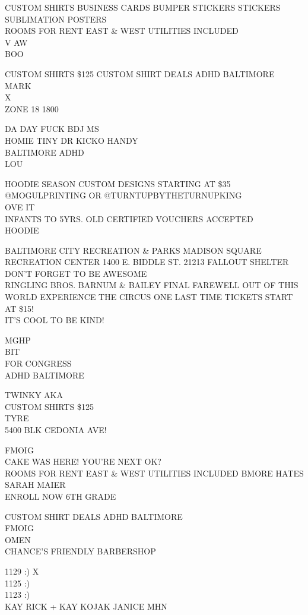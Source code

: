 \documentclass[10pt,letterpaper]{article}
\begin{document}
CUSTOM SHIRTS BUSINESS CARDS BUMPER STICKERS STICKERS SUBLIMATION POSTERS\\
ROOMS FOR RENT EAST \& WEST UTILITIES INCLUDED\\
V AW\\
BOO

CUSTOM SHIRTS \$125 CUSTOM SHIRT DEALS ADHD BALTIMORE\\
MARK\\
X\\
ZONE 18 1800

DA DAY FUCK BDJ MS\\
HOMIE TINY DR  KICKO HANDY\\
BALTIMORE ADHD\\
LOU

HOODIE SEASON CUSTOM DESIGNS STARTING AT \$35 @MOGULPRINTING OR @TURNTUPBYTHETURNUPKING\\
OVE IT\\
INFANTS TO 5YRS. OLD CERTIFIED VOUCHERS ACCEPTED\\
HOODIE

BALTIMORE CITY RECREATION \& PARKS MADISON SQUARE RECREATION CENTER 1400 E. BIDDLE ST. 21213 FALLOUT SHELTER\\
DON'T FORGET TO BE AWESOME\\
RINGLING BROS. BARNUM \& BAILEY FINAL FAREWELL OUT OF THIS WORLD EXPERIENCE THE CIRCUS ONE LAST TIME TICKETS START AT \$15!\\
IT'S COOL TO BE KIND!

MGHP\\
BIT\\
FOR CONGRESS\\
ADHD BALTIMORE

TWINKY AKA\\
CUSTOM SHIRTS \$125\\
TYRE\\
5400 BLK CEDONIA AVE!

FMOIG\\
CAKE WAS HERE!  YOU'RE NEXT OK?\\
ROOMS FOR RENT EAST \& WEST UTILITIES INCLUDED BMORE HATES SARAH MAIER\\
ENROLL NOW 6TH GRADE

CUSTOM SHIRT DEALS ADHD BALTIMORE\\
FMOIG\\
OMEN\\
CHANCE'S FRIENDLY BARBERSHOP

1129 :) X\\
1125 :)\\
1123 :)\\
KAY RICK + KAY KOJAK JANICE MHN
\end{document}
